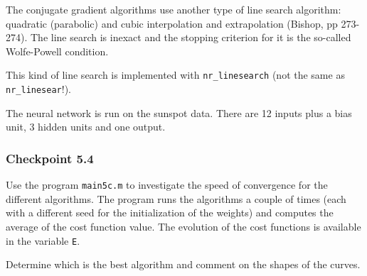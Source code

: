 \documentclass[12pt]{article}
\begin{document}
The conjugate gradient algorithms use another type of line search
algorithm: quadratic (parabolic) and cubic interpolation and
extrapolation (Bishop, pp 273-274). The line search is inexact and
the stopping criterion for it is the so-called Wolfe-Powell condition.

This kind of line search is implemented with {\tt nr\_linesearch}
(not the same as {\tt nr\_linesear}!).

The neural network is run on the sunspot data. There are 12 inputs
plus a bias unit, 3 hidden units and one output.


\subsubsection*{Checkpoint 5.4}

Use the program {\tt main5c.m} to investigate the speed of
convergence for the different algorithms. The program runs the
algorithms a couple of times (each with a different seed for the
initialization of the weights) and computes the average of the
cost function value. The evolution of the cost functions is
available in the variable {\tt E}.

Determine which is the best algorithm and comment on the shapes of the
curves.
\end{document}
